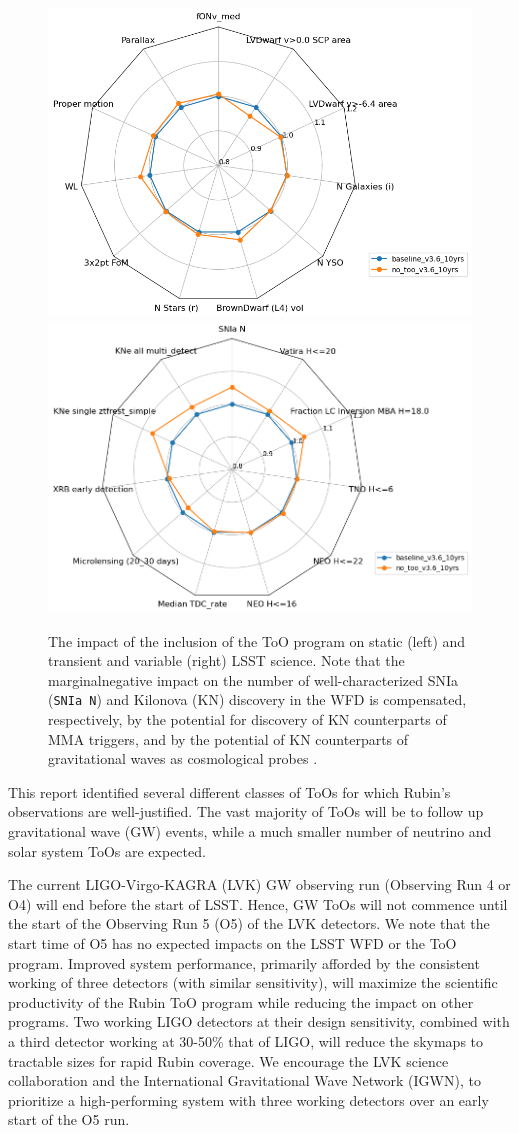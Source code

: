 \begin{figure}
    \centering
    \includegraphics[width=0.5\linewidth]{figures/baseline_v36_wfd_static.png}\includegraphics[width=0.5\linewidth]{figures/baseline_v36_wfd_transient.png}
    \caption{The impact of the inclusion of the ToO program on static (left) and transient and variable (right) LSST science. Note that the marginalnegative impact on the number of well-characterized SNIa (\texttt{SNIa N}) and Kilonova (KN) discovery in the WFD is compensated, respectively, by the potential for discovery of KN counterparts of MMA triggers, and by the potential of KN counterparts of gravitational waves as cosmological probes \citep{sneppen2023measuring}.}
    \label{fig:too}
\end{figure}
This report identified several different classes of ToOs for which Rubin's observations are well-justified. The vast majority of ToOs will be to follow up gravitational wave (GW) events, while a much smaller number of neutrino and solar system ToOs are expected. 

The current LIGO-Virgo-KAGRA (LVK) GW observing run (Observing Run 4 or O4) will end before the start of LSST. Hence, GW ToOs will not commence until the start of the Observing Run 5 (O5) of the LVK detectors. We note that the start time of O5 has no expected impacts on the LSST WFD or the ToO program. Improved system performance, primarily afforded by the consistent working of three detectors (with similar sensitivity), will maximize the scientific productivity of the Rubin ToO program while reducing the impact on other programs. Two working LIGO detectors at their design sensitivity, combined with a third detector working at 30-50\% that of LIGO, will reduce the skymaps to tractable sizes for rapid Rubin coverage. We encourage the LVK science collaboration and the International Gravitational Wave Network (IGWN), to prioritize a high-performing system with three working detectors over an early start of the O5 run. 

